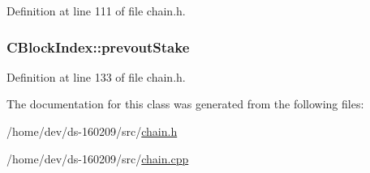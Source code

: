 Definition at line 111 of file chain.\+h.

\hypertarget{class_c_block_index_ac2c040d5e3db73a5ceb87ee4095a405f}{}
\subsubsection[{prevout\+Stake}]{ C\+Block\+Index\+::prevout\+Stake}\label{class_c_block_index_ac2c040d5e3db73a5ceb87ee4095a405f}


Definition at line 133 of file chain.\+h.



The documentation for this class was generated from the following files\+:\begin{DoxyCompactItemize}
\item 
/home/dev/ds-\/160209/src/\hyperlink{chain_8h}{chain.\+h}\item 
/home/dev/ds-\/160209/src/\hyperlink{chain_8cpp}{chain.\+cpp}\end{DoxyCompactItemize}
